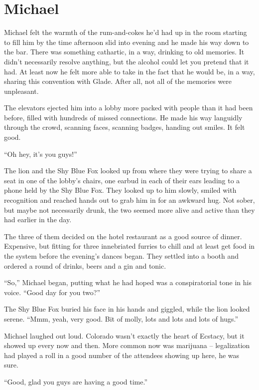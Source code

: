 \chapter{Michael}

Michael felt the warmth of the rum-and-cokes he'd had up in the room starting to fill him by the time afternoon slid into evening and he made his way down to the bar. There was something cathartic, in a way, drinking to old memories.  It didn't necessarily resolve anything, but the alcohol could let you pretend that it had.  At least now he felt more able to take in the fact that he would be, in a way, sharing this convention with Glade.  After all, not all of the memories were unpleasant.

The elevators ejected him into a lobby more packed with people than it had been before, filled with hundreds of missed connections.  He made his way languidly through the crowd, scanning faces, scanning badges, handing out smiles.  It felt good.

``Oh hey, it's you guys!''

The lion and the Shy Blue Fox looked up from where they were trying to share a seat in one of the lobby's chairs, one earbud in each of their ears leading to a phone held by the Shy Blue Fox.  They looked up to him slowly, smiled with recognition and reached hands out to grab him in for an awkward hug.  Not sober, but maybe not necessarily drunk, the two seemed more alive and active than they had earlier in the day.

The three of them decided on the hotel restaurant as a good source of dinner.  Expensive, but fitting for three innebriated furries to chill and at least get food in the system before the evening's dances began.  They settled into a booth and ordered a round of drinks, beers and a gin and tonic.

``So,'' Michael began, putting what he had hoped was a conspiratorial tone in his voice.  ``Good day for you two?''

The Shy Blue Fox buried his face in his hands and giggled, while the lion looked serene.  ``Mmm, yeah, very good.  Bit of molly, lots and lots and lots of hugs.''

Michael laughed out loud.  Colorado wasn't exactly the heart of Ecstacy, but it showed up every now and then.  More common now was marijuana -- legalization had played a roll in a good number of the attendees showing up here, he was sure.

``Good, glad you guys are having a good time.''

